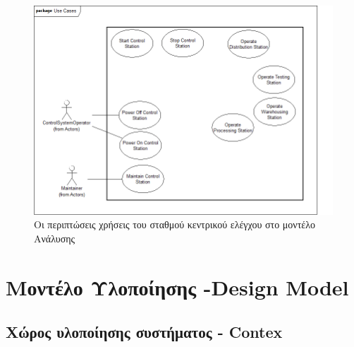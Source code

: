 \documentclass[a4paper,12pt,twoside]{report}
\begin{document}
{\begin{appendices}
			\clearpage
			\begin{figure}[hp]
					\centering
					\includegraphics[scale=0.30]{AnalysisModel_uc-CentralControlStationsUseCases.png}
					\caption{Οι περιπτώσεις χρήσεις του σταθμού κεντρικού ελέγχου στο μοντέλο Ανάλυσης}
					\label{φωτ:Οι περιπτώσεις χρήσεις του σταθμού κεντρικού ελέγχου στο μοντέλο Ανάλυσης}
			\end{figure}
		
		\FloatBarrier
		\section{Μοντέλο Υλοποίησης  -Design Model}
		
			\FloatBarrier
			\subsection{Χώρος υλοποίησης συστήματος - Contex}
			

\end{appendices}}
\end{document}
